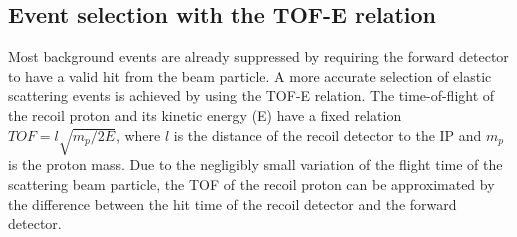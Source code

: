 \documentclass[number,5p]{elsarticle}
\begin{document}
\subsection{Event selection with the TOF-E relation}
\label{sec:tofe_selection}

Most background events are already suppressed by requiring the forward detector to have a valid hit from the beam particle.
A more accurate selection of elastic scattering events is achieved by using the TOF-E relation.
The time-of-flight of the recoil proton and its kinetic energy (E)
have a fixed relation $TOF = l\sqrt{m_p/2E}$, where $l$ is the distance of
the recoil detector to the IP and $m_p$ is the proton mass.
Due to the negligibly small variation of the flight time of the scattering beam particle,
the TOF of the recoil proton can be approximated by the difference between the hit time of the recoil detector and the forward detector.
\end{document}
